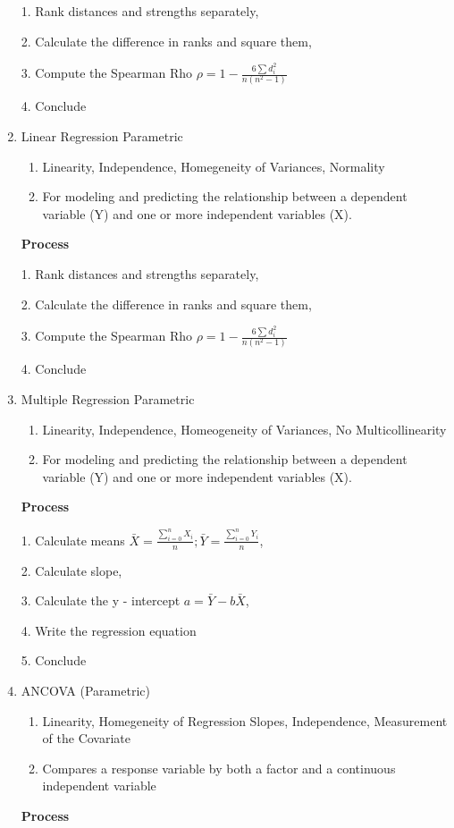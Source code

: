 \documentclass[6pt]{article}
\begin{document}
\begin{multicols*}{2}
\begin{enumerate}
        1. Rank distances and strengths separately, 
    
        2. Calculate the difference in ranks and square them,

        3. Compute the Spearman Rho $\displaystyle \rho = 1 - \frac{6\sum{d_i^2}}{n(n^2-1)}$
    
        4. Conclude

        \item Linear Regression {Parametric}
        \begin{enumerate}
            \item Linearity, Independence, Homegeneity of Variances, Normality
            \item For modeling and predicting the relationship between a dependent variable 
            (Y) and one or more independent variables (X).
        \end{enumerate}
        \textbf{Process}
            
        1. Rank distances and strengths separately, 
    
        2. Calculate the difference in ranks and square them,

        3. Compute the Spearman Rho $\displaystyle \rho = 1 - \frac{6\sum{d_i^2}}{n(n^2-1)}$
    
        4. Conclude

        \item Multiple Regression {Parametric}
        \begin{enumerate}
            \item Linearity, Independence, Homeogeneity of Variances, No Multicollinearity
            \item For modeling and predicting the relationship between a dependent variable 
            (Y) and one or more independent variables (X).
        \end{enumerate}
        \textbf{Process}
            
        1. Calculate means $\displaystyle \bar{X} = \frac{\sum_{i=0}^n{X_i}}{n};\bar{Y} = \frac{\sum_{i=0}^n{Y_i}}{n}$, 
    
        2. Calculate slope, 

        3. Calculate the y - intercept $a = \bar{Y} - b\bar{X}$,
    
        4. Write the regression equation

        5. Conclude

        \item ANCOVA (Parametric)
        \begin{enumerate}
            \item Linearity, Homegeneity of Regression Slopes, Independence, Measurement of the Covariate
            \item Compares a response variable by both a factor and a continuous independent variable
        \end{enumerate}
        \textbf{Process}
            

\end{enumerate}
\end{multicols*}
\end{document}
